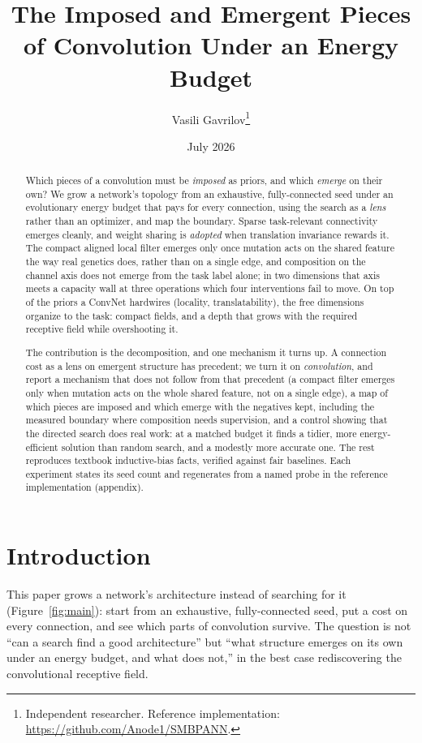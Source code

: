 \documentclass[11pt]{article}
\title{\textbf{The Imposed and Emergent Pieces of Convolution Under an Energy Budget}}
\author{Vasili Gavrilov\thanks{Independent researcher. Reference implementation:
\url{https://github.com/Anode1/SMBPANN}.}}
\date{July 2026}
\begin{document}
\maketitle

\begin{abstract}
Which pieces of a convolution must be \emph{imposed} as priors, and which \emph{emerge} on their own? We
grow a network's topology from an exhaustive, fully-connected seed under an evolutionary energy budget that
pays for every connection, using the search as a \emph{lens} rather than an optimizer, and map the
boundary. Sparse task-relevant connectivity emerges cleanly, and weight sharing is \emph{adopted} when
translation invariance rewards it. The compact aligned local filter emerges only once mutation acts on the
shared feature the way real genetics does, rather than on a single edge, and composition on the channel
axis does not emerge from the task label alone; in two dimensions that axis meets a capacity wall at
three operations which four interventions fail to move. On top of the priors a ConvNet hardwires (locality,
translatability), the free dimensions organize to the task: compact fields, and a depth that grows with the
required receptive field while overshooting it.

The contribution is the decomposition, and one mechanism it turns up. A connection cost as a lens on
emergent structure has precedent; we turn it on \emph{convolution}, and report a mechanism that does not
follow from that precedent (a compact filter emerges only when mutation acts on the whole shared feature,
not on a single edge), a map of which pieces are imposed and which emerge with the negatives kept,
including the measured boundary where composition needs supervision, and a control showing that the
directed search does real work: at a matched budget it finds a tidier, more energy-efficient solution than
random search, and a modestly more accurate one. The rest reproduces textbook inductive-bias facts,
verified against fair baselines. Each experiment states its seed count and regenerates from a
named probe in the reference implementation (appendix).
\end{abstract}

\section{Introduction}

This paper grows a network's architecture instead of searching for it (Figure~\ref{fig:main}): start from
an exhaustive, fully-connected seed, put a cost on every connection, and see which parts of convolution
survive. The question is not ``can a search find a good architecture'' but ``what structure emerges on its
own under an energy budget, and what does not,'' in the best case rediscovering the convolutional
receptive field.
\end{document}
